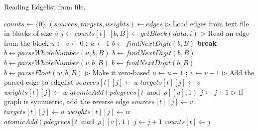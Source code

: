 \begin{algorithm}[hbtp]
\caption{Reading Edgelist from file.}
\label{alg:load-el}
\begin{algorithmic}[1]

\Statex

 \label{alg:el--read-edgelist-begin}
  \State $counts \gets \{0\}$ \label{alg:el--initialize-begin}
  \State $(sources, targets, weights) \gets edges$ \label{alg:el--initialize-end}
  \State $\rhd$ Load edges from text file in blocks of size $\beta$
   \label{alg:el--blocks-begin}
    \State $j \gets counts[t]$
    \State $[b, B] \gets getBlock(data, i)$ \label{alg:el--get-block}
     \label{alg:el--block-begin}
      \State $\rhd$ Read an edge from the block
      \State $u \gets v \gets 0$ \textbf{;} $w \gets 1$ \label{alg:el--parse-edge-begin}
      \State $b \gets findNextDigit(b, B)$
       \textbf{break}
      \EndIf
      \State $b \gets parseWholeNumber(u, b, B)$
      \State $b \gets findNextDigit(b, B)$
      \State $b \gets parseWholeNumber(v, b, B)$
        \State $b \gets findNextDigit(b, B)$
        \State $b \gets parseFloat(w, b, B)$
      \EndIf \label{alg:el--parse-edge-end}
      \State $\rhd$ Make it zero-based
      \State $u \gets u - 1$ \textbf{;} $v \gets v - 1$ \label{alg:el--base1}
      \State $\rhd$ Add the parsed edge to edgelist
      \State $sources[t][j] \gets u$ \label{alg:el--add-edge-begin}
      \State $targets[t][j] \gets v$
       $weights[t][j] \gets w$
      \EndIf
      \State $atomicAdd(pdegrees[t \bmod \rho][u], 1)$ \label{alg:el--update-degrees}
      \State $j \gets j + 1$ \label{alg:el--add-edge-end}
      \State $\rhd$ If graph is symmetric, add the reverse edge
       \label{alg:el--reverse-edge-begin}
        \State $sources[t][j] \gets v$
        \State $targets[t][j] \gets u$
         $weights[t][j] \gets w$
        \EndIf
        \State $atomicAdd(pdegrees[t \bmod \rho][v], 1)$
        \State $j \gets j + 1$
      \EndIf \label{alg:el--reverse-edge-end}
    \EndWhile \label{alg:el--block-end}
    \State $counts[t] \gets j$ \label{alg:el--update-counts}
  \EndFor \label{alg:el--blocks-end}
   \label{alg:el--return-counts}
\EndFunction \label{alg:el--read-edgelist-end}


\end{algorithmic}
\end{algorithm}
